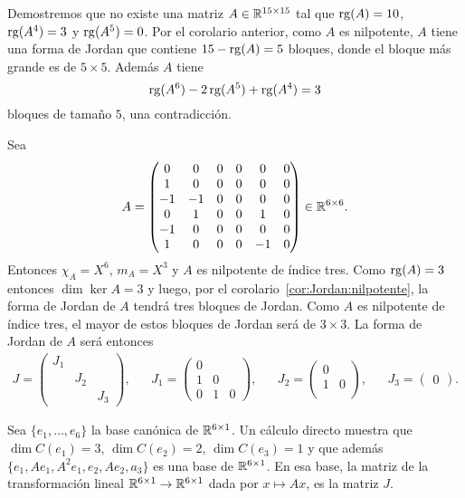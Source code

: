 \begin{example}
    Demostremos que no existe una matriz $A\in\mathbb{R}^{15\times15}$ tal que
    $\operatorname{rg}(A)=10$, $\operatorname{rg}(A^4)=3$ y $\operatorname{rg}(A^5)=0$. Por el corolario anterior, como
    $A$ es nilpotente, $A$ tiene una forma de Jordan que contiene $15-\operatorname{rg}(A)=5$
    bloques, donde el bloque más grande es de $5\times 5$. Además $A$ tiene
    \[
        \operatorname{rg}(A^6)-2\operatorname{rg}(A^5)+\operatorname{rg}(A^4)=3
    \]
    bloques de tamaño $5$, una contradicción. 
\end{example}

\begin{example}
	Sea
	\[
		A=\begin{pmatrix}
			0 & 0 & 0 & 0 & 0 & 0\\
			1 & 0 & 0 & 0 & 0 & 0\\
			-1 & -1 & 0 & 0 & 0 & 0\\
			0 & 1 & 0 & 0 & 1 & 0\\
			-1 & 0 & 0 & 0 & 0 & 0\\
			1 & 0 & 0 & 0 & -1 & 0
		\end{pmatrix}\in\mathbb{R}^{6\times6}.
	\]
	Entonces $\chi_A=X^6$, $m_A=X^3$ y $A$ es nilpotente de índice tres. Como
	$\operatorname{rg}(A)=3$ entonces $\dim\ker A=3$ y luego, por el
	corolario~\ref{cor:Jordan:nilpotente}, la forma de Jordan de $A$ tendrá
	tres bloques de Jordan. Como $A$ es nilpotente de índice tres, el mayor de
	estos bloques de Jordan será de $3\times3$. La forma de Jordan de $A$ será
	entonces
	\begin{align*}
		J=
		\begin{pmatrix}
			J_1\\
			& J_2\\
			&& J_3
		\end{pmatrix},
		&&
		J_1=\begin{pmatrix}
			0 & \\  
			1 & 0\\
			0 & 1 & 0
		\end{pmatrix},
		&&
		J_2=\begin{pmatrix}
			0\\
			1 & 0\\
		\end{pmatrix},
		&&
		J_3=\begin{pmatrix}
			0
		\end{pmatrix}.
	\end{align*}

	Sea $\{e_1,\dots,e_6\}$ la base canónica de $\mathbb{R}^{6\times1}$. Un cálculo
	directo muestra que $\dim C(e_1)=3$, $\dim C(e_2)=2$, $\dim C(e_3)=1$ y que
	además $\{e_1,Ae_1,A^2e_1,e_2,Ae_2,a_3\}$ es una base de $\mathbb{R}^{6\times1}$.
	En esa base, la matriz de la transformación lineal $\mathbb{R}^{6\times1}\to\mathbb{R}^{6\times1}$ dada
	por $x\mapsto Ax$, es la matriz $J$. 
\end{example}


